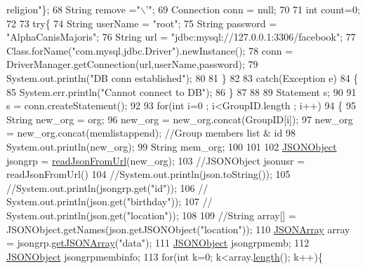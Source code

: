 \begin{DoxyCode}
{      religion"}\};
68       String \textcolor{keyword}{remove} =\textcolor{stringliteral}{"\(\backslash\)'"};
69       Connection conn = null;
70 
71         \textcolor{keywordtype}{int} count=0;
72         
73         \textcolor{keywordflow}{try}\{
74             String userName = \textcolor{stringliteral}{"root"};
75             String password = \textcolor{stringliteral}{"AlphaCanisMajoris"};
76             String url = \textcolor{stringliteral}{"jdbc:mysql://127.0.0.1:3306/facebook"};
77                 Class.forName(\textcolor{stringliteral}{"com.mysql.jdbc.Driver"}).newInstance();
78                 conn = DriverManager.getConnection(url,userName,password);
79                 System.out.println(\textcolor{stringliteral}{"DB conn established"});
80 
81         \}
82     
83         \textcolor{keywordflow}{catch}(Exception e)
84         \{
85             System.err.println(\textcolor{stringliteral}{"Cannot connect to DB"});
86         \}
87         
88         
89         Statement s;
90         
91         s = conn.createStatement();
92         
93         \textcolor{keywordflow}{for}(\textcolor{keywordtype}{int} i=0 ; i<GroupID.length ; i++)
94         \{
95             String new\_org = org;
96             new\_org = new\_org.concat(GroupID[i]);
97             new\_org = new\_org.concat(memlistappend); \textcolor{comment}{//Group members list & id}
98             System.out.println(new\_org);  
99             String mem\_org;
100             
101       
102     \hyperlink{classorg_1_1json_1_1_j_s_o_n_object}{JSONObject} jsongrp = \hyperlink{class_json_reader_a3775f51fc2a7f68a3ac711dc256283de}{readJsonFromUrl}(new\_org);
103     \textcolor{comment}{//JSONObject jsonusr = readJsonFromUrl()}
104     \textcolor{comment}{//System.out.println(json.toString());}
105     \textcolor{comment}{//System.out.println(jsongrp.get("id"));}
106    \textcolor{comment}{// System.out.println(json.get("birthday"));}
107    \textcolor{comment}{// System.out.println(json.get("location"));}
108     
109     \textcolor{comment}{//String array[] = JSONObject.getNames(json.getJSONObject("location"));}
110     \hyperlink{classorg_1_1json_1_1_j_s_o_n_array}{JSONArray} array = jsongrp.\hyperlink{classorg_1_1json_1_1_j_s_o_n_object_a884ee44fe958e9ea737d6c5e1180cb62}{getJSONArray}(\textcolor{stringliteral}{"data"});
111     \hyperlink{classorg_1_1json_1_1_j_s_o_n_object}{JSONObject} jsongrpmemb;
112     \hyperlink{classorg_1_1json_1_1_j_s_o_n_object}{JSONObject} jsongrpmembinfo;
113     \textcolor{keywordflow}{for}(\textcolor{keywordtype}{int} k=0; k<array.\hyperlink{classorg_1_1json_1_1_j_s_o_n_array_a8382a78090007f650a02895ecbf3c8ec}{length}(); k++)\{

\end{DoxyCode}

